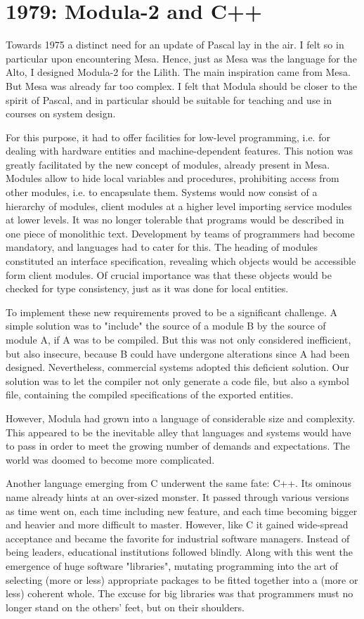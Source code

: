 \section{1979: Modula-2 and C++}
Towards 1975 a distinct need for an update of Pascal lay in the air. I felt so in
particular upon encountering Mesa. Hence, just as Mesa was the language for the
Alto, I designed Modula-2 for the Lilith. The main inspiration came from Mesa. But
Mesa was already far too complex. I felt that Modula should be closer to the spirit
of Pascal, and in particular should be suitable for teaching and use in courses on
system design.

For this purpose, it had to offer facilities for low-level programming, i.e. for dealing
with hardware entities and machine-dependent features. This notion was greatly
facilitated by the new concept of modules, already present in Mesa. Modules allow
to hide local variables and procedures, prohibiting access from other modules, i.e.
to encapsulate them. Systems would now consist of a hierarchy of modules, client
modules at a higher level importing service modules at lower levels. It was no
longer tolerable that programs would be described in one piece of monolithic text.
Development by teams of programmers had become mandatory, and languages
had to cater for this. The heading of modules constituted an interface specification,
revealing which objects would be accessible form client modules. Of crucial
importance was that these objects would be checked for type consistency, just as it
was done for local entities.

To implement these new requirements proved to be a significant challenge. A
simple solution was to "include" the source of a module B by the source of module
A, if A was to be compiled. But this was not only considered inefficient, but also
insecure, because B could have undergone alterations since A had been designed.
Nevertheless, commercial systems adopted this deficient solution. Our solution
was to let the compiler not only generate a code file, but also a symbol file,
containing the compiled specifications of the exported entities.

However, Modula had grown into a language of considerable size and complexity.
This appeared to be the inevitable alley that languages and systems would have to
pass in order to meet the growing number of demands and expectations. The
world was doomed to become more complicated.

Another language emerging from C underwent the same fate: C++. Its ominous
name already hints at an over-sized monster. It passed through various versions
as time went on, each time including new feature, and each time becoming bigger
and heavier and more difficult to master. However, like C it gained wide-spread
acceptance and became the favorite for industrial software managers. Instead of
being leaders, educational institutions followed blindly. Along with this went the
emergence of huge software "libraries", mutating programming into the art of
selecting (more or less) appropriate packages to be fitted together into a (more or
less) coherent whole. The excuse for big libraries was that programmers must no
longer stand on the others' feet, but on their shoulders.
